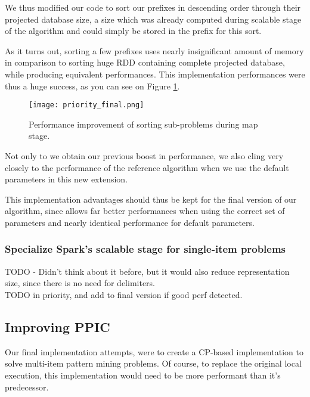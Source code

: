 \documentclass{eplmastersthesis}
\begin{document}
We thus modified our code to sort our prefixes in descending order through their projected database size, a size which was already computed during scalable stage of the algorithm and could simply be stored in the prefix for this sort. \newline

As it turns out, sorting a few prefixes uses nearly insignificant amount of memory in comparison to sorting huge RDD containing complete projected database, while producing equivalent performances. This implementation performances were thus a huge success, as you can see on Figure \ref{fig:priority_scheduling_improved}. \newline

\begin{figure}[h]
  \centering
  \texttt{[image: priority\_final.png]}
  \caption{Performance improvement of sorting sub-problems during map stage.}
  \label{fig:priority_scheduling_improved}
\end{figure}

Not only to we obtain our previous boost in performance, we also cling very closely to the performance of the reference algorithm when we use the default parameters in this new extension. \newline

This implementation advantages should thus be kept for the final version of our algorithm, since allows far better performances when using the correct set of parameters and nearly identical performance for default parameters.

\subsubsection{Specialize Spark's scalable stage for single-item problems}

TODO - Didn't think about it before, but it would also reduce representation size, since there is no need for delimiters. \\
TODO in priority, and add to final version if good perf detected.

\subsection{Improving PPIC}

Our final implementation attempts, were to create a CP-based implementation to solve multi-item pattern mining problems. Of course, to replace the original local execution, this implementation would need to be more performant than it's predecessor.
\end{document}
